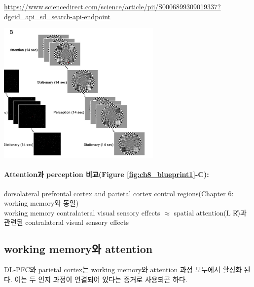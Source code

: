 \documentclass[../note.tex]{subfiles}
\begin{document}
{  \url{https://www.sciencedirect.com/science/article/pii/S0006899309019337?dgcid=api\_sd\_search-api-endpoint}
  \begin{center}
    \includegraphics[width=0.6\textwidth]{image/ch8_bp2}
    \label{fig:ch8_bp2}
  \end{center}
  \paragraph{Attention과 perception 비교(Figure \ref{fig:ch8_blueprint1}-C):}
  dorsolateral prefrontal cortex and parietal cortex control regions(Chapter 6: working memory와 동일)\\
  working memory contralateral visual sensory effects $\approx$ spatial attention(L \| R)과 관련된 contralateral visual sensory effects
}

\subsection{working memory와 attention}
DL-PFC와 parietal cortex는 working memory와 attention 과정 모두에서 활성화 된다.
이는 두 인지 과정이 연결되어 있다는 증거로 사용되곤 하다.
\end{document}
